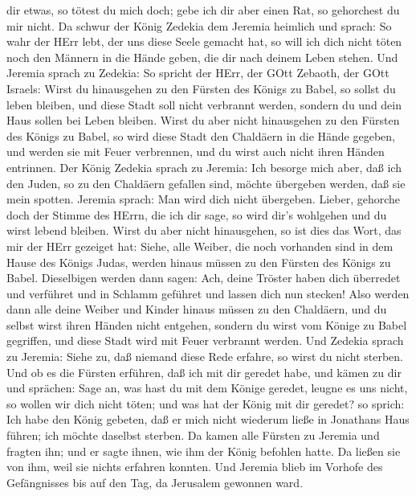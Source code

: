 dir etwas, so tötest du mich doch; gebe ich dir aber einen Rat, so
gehorchest du mir nicht.  Da schwur der König Zedekia dem
Jeremia heimlich und sprach: So wahr der HErr lebt, der uns diese Seele
gemacht hat, so will ich dich nicht töten noch den Männern in die Hände
geben, die dir nach deinem Leben stehen.  Und Jeremia
sprach zu Zedekia: So spricht der HErr, der GOtt Zebaoth, der GOtt
Israels: Wirst du hinausgehen zu den Fürsten des Königs zu Babel, so
sollst du leben bleiben, und diese Stadt soll nicht verbrannt werden,
sondern du und dein Haus sollen bei Leben bleiben.  Wirst
du aber nicht hinausgehen zu den Fürsten des Königs zu Babel, so wird
diese Stadt den Chaldäern in die Hände gegeben, und werden sie mit Feuer
verbrennen, und du wirst auch nicht ihren Händen entrinnen.
 Der König Zedekia sprach zu Jeremia: Ich besorge mich
aber, daß ich den Juden, so zu den Chaldäern gefallen sind, möchte
übergeben werden, daß sie mein spotten.  Jeremia sprach:
Man wird dich nicht übergeben. Lieber, gehorche doch der Stimme des
HErrn, die ich dir sage, so wird dir's wohlgehen und du wirst lebend
bleiben.  Wirst du aber nicht hinausgehen, so ist dies das
Wort, das mir der HErr gezeiget hat:  Siehe, alle Weiber,
die noch vorhanden sind in dem Hause des Königs Judas, werden hinaus
müssen zu den Fürsten des Königs zu Babel. Dieselbigen werden dann
sagen: Ach, deine Tröster haben dich überredet und verführet und in
Schlamm geführet und lassen dich nun stecken!  Also werden
dann alle deine Weiber und Kinder hinaus müssen zu den Chaldäern, und du
selbst wirst ihren Händen nicht entgehen, sondern du wirst vom Könige zu
Babel gegriffen, und diese Stadt wird mit Feuer verbrannt werden.
 Und Zedekia sprach zu Jeremia: Siehe zu, daß niemand diese
Rede erfahre, so wirst du nicht sterben.  Und ob es die
Fürsten erführen, daß ich mit dir geredet habe, und kämen zu dir und
sprächen: Sage an, was hast du mit dem Könige geredet, leugne es uns
nicht, so wollen wir dich nicht töten; und was hat der König mit dir
geredet?  so sprich: Ich habe den König gebeten, daß er
mich nicht wiederum ließe in Jonathans Haus führen; ich möchte daselbst
sterben.  Da kamen alle Fürsten zu Jeremia und fragten ihn;
und er sagte ihnen, wie ihm der König befohlen hatte. Da ließen sie von
ihm, weil sie nichts erfahren konnten.  Und Jeremia blieb
im Vorhofe des Gefängnisses bis auf den Tag, da Jerusalem gewonnen ward.


